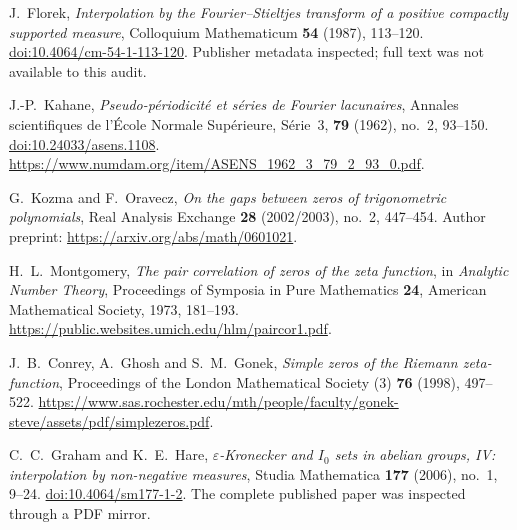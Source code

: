 J.~Florek,
\emph{Interpolation by the Fourier--Stieltjes transform of a positive compactly supported measure},
Colloquium Mathematicum \textbf{54} (1987), 113--120.
\href{https://doi.org/10.4064/cm-54-1-113-120}{doi:10.4064/cm-54-1-113-120}.
Publisher metadata inspected; full text was not available to this audit.

J.-P.~Kahane,
\emph{Pseudo-p\'eriodicit\'e et s\'eries de Fourier lacunaires},
Annales scientifiques de l'\'Ecole Normale Sup\'erieure, S\'erie~3,
\textbf{79} (1962), no.~2, 93--150.
\href{https://doi.org/10.24033/asens.1108}{doi:10.24033/asens.1108}.
\url{https://www.numdam.org/item/ASENS_1962_3_79_2_93_0.pdf}.

G.~Kozma and F.~Oravecz,
\emph{On the gaps between zeros of trigonometric polynomials},
Real Analysis Exchange \textbf{28} (2002/2003), no.~2, 447--454.
Author preprint: \url{https://arxiv.org/abs/math/0601021}.

H.~L.~Montgomery,
\emph{The pair correlation of zeros of the zeta function},
in \emph{Analytic Number Theory}, Proceedings of Symposia in Pure
Mathematics \textbf{24}, American Mathematical Society, 1973,
181--193.
\url{https://public.websites.umich.edu/hlm/paircor1.pdf}.

J.~B.~Conrey, A.~Ghosh and S.~M.~Gonek,
\emph{Simple zeros of the Riemann zeta-function},
Proceedings of the London Mathematical Society (3)
\textbf{76} (1998), 497--522.
\url{https://www.sas.rochester.edu/mth/people/faculty/gonek-steve/assets/pdf/simplezeros.pdf}.

C.~C.~Graham and K.~E.~Hare,
\emph{$\varepsilon$-Kronecker and $I_0$ sets in abelian groups, IV:
interpolation by non-negative measures},
Studia Mathematica \textbf{177} (2006), no.~1, 9--24.
\href{https://doi.org/10.4064/sm177-1-2}{doi:10.4064/sm177-1-2}.
The complete published paper was inspected through a PDF mirror.
